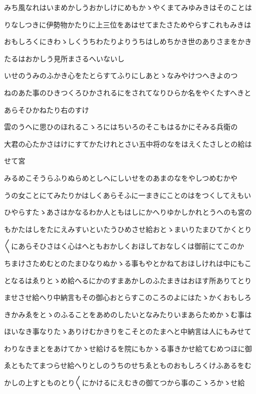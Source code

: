 \documentclass[a4paper,11pt,landscape]{ltjtarticle}
\begin{document}
みち風なれはいまめかしうおかしけにめもかゝやくまてみゆみきはそのことは
\par\medskip
りなしつきに伊勢物かたりに上三位をあはせてまたさためやらすこれもみきは
\par\medskip
おもしろくにきわゝしくうちわたりよりうちはしめちかき世のありさまをかき
\par\medskip
たるはおかしう見所まさるへいないし
\par\medskip
いせのうみのふかき心をたとらすてふりにしあとゝなみやけつへきよのつ
\par\medskip
ねのあた事のひきつくろひかされるにをされてなりひらか名をやくたすへきと
\par\medskip
あらそひかねたり右のすけ
\par\medskip
雲のうへに思ひのほれるこゝろにはちいろのそこもはるかにそみる兵衛の
\par\medskip
大君の心たかさはけにすてかたけれとさい五中将のなをはえくたさしとの給は
\par\medskip
せて宮
\par\medskip
みるめこそうらふりぬらめとしへにしいせをのあまのなをやしつめむかや
\par\medskip
うの女ことにてみたりかはしくあらそふに一まきにことのはをつくしてえもい
\par\medskip
ひやらすたゝあさはかなるわか人ともはしにかへりゆかしかれとうへのも宮の
\par\medskip
もかたはしをたにえみすいといたうひめさせ給おとゝまいりたまひてかくとり
\par\medskip
〱にあらそひさはく心はへともおかしくおほしておなしくは御前にてこのか
\par\medskip
ちまけさためむとのたまひなりぬかゝる事もやとかねておほしけれは中にもこ
\par\medskip
となるはゑりとゝめ給へるにかのすまあかしのふたまきはおほす所ありてとり
\par\medskip
ませさせ給へり中納言もその御心おとらすこのころのよにはたゝかくおもしろ
\par\medskip
きかみゑをとゝのふることをあめのしたいとなみたりいまあらためかゝむ事は
\par\medskip
ほいなき事なりたゝありけむかきりをこそとのたまへと中納言は人にもみせて
\par\medskip
わりなきまとをあけてかゝせ給けるを院にもかゝる事きかせ給てむめつほに御
\par\medskip
ゑともたてまつらせ給へりとしのうちのせちゑとものおもしろくけふあるをむ
\par\medskip
かしの上すとものとり〱にかけるにえむきの御てつから事のこゝろかゝせ給
\end{document}
